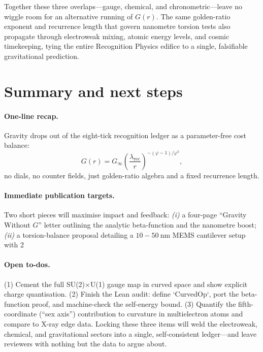 \documentclass[11pt,oneside]{book}
\begin{document}
{Together these three overlaps—gauge, chemical, and chronometric—leave no wiggle room for an alternative running of \(G(r)\).  The same golden-ratio exponent and recurrence length that govern nanometre torsion tests also propagate through electroweak mixing, atomic energy levels, and cosmic timekeeping, tying the entire Recognition Physics edifice to a single, falsifiable gravitational prediction.
\section{Summary and next steps}

\paragraph{One-line recap.}
Gravity drops out of the eight-tick recognition ledger as a parameter-free cost balance:  
\[
   G(r)=G_{\infty}\!\left(\frac{\lambda_{\text{rec}}}{r}\right)^{-(\varphi-1)/\varphi^{5}},
\]
no dials, no counter fields, just golden-ratio algebra and a fixed recurrence length.

\paragraph{Immediate publication targets.}
Two short pieces will maximise impact and feedback:  
\textit{(i)} a four-page “Gravity Without \(G\)” letter outlining the analytic beta-function and the nanometre boost;  
\textit{(ii)} a torsion-balance proposal detailing a \(10\!-\!50~\mathrm{nm}\) MEMS cantilever setup with 2 %

\paragraph{Open to-dos.}
(1) Cement the full SU(2)\(\times\)U(1) gauge map in curved space and show explicit charge quantisation.  
(2) Finish the Lean audit: define `CurvedOp`, port the beta-function proof, and machine-check the self-energy bound.  
(3) Quantify the fifth-coordinate (“sex axis”) contribution to curvature in multielectron atoms and compare to X-ray edge data.  
Locking these three items will weld the electroweak, chemical, and gravitational sectors into a single, self-consistent ledger—and leave reviewers with nothing but the data to argue about.


}
\end{document}
